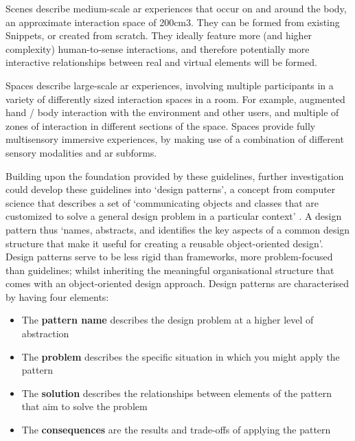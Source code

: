 Scenes describe medium-scale \gls{ar} experiences that occur on and around the body, an approximate interaction space of 200cm3. They can be formed from existing Snippets, or created from scratch. They ideally feature more (and higher complexity) human-to-sense interactions, and therefore potentially more interactive relationships between real and virtual elements will be formed.

Spaces describe large-scale \gls{ar} experiences, involving multiple participants in a variety of differently sized interaction spaces in a room. For example, augmented hand / body interaction with the environment and other users, and multiple of zones of interaction in different sections of the space. Spaces provide fully multisensory immersive experiences, by making use of a combination of different sensory modalities and \gls{ar} subforms.

Building upon the foundation provided by these guidelines, further investigation could develop these guidelines into `design patterns', a concept from computer science that describes a set of `communicating objects and classes that are customized to solve a general design problem in a particular context' \citep{gamma1995}. A design pattern thus `names, abstracts, and identifies the key aspects of a common design structure that make it useful for creating a reusable object-oriented design'. Design patterns serve to be less rigid than frameworks, more problem-focused than guidelines; whilst inheriting the meaningful organisational structure that comes with an object-oriented design approach. Design patterns are characterised by having four elements:
\begin{itemize}
    \item The \textbf{pattern name} describes the design problem at a higher level of abstraction
    \item The \textbf{problem} describes the specific situation in which you might apply the pattern
    \item The \textbf{solution} describes the relationships between elements of the pattern that aim to solve the problem
    \item The \textbf{consequences} are the results and trade-offs of applying the pattern
\end{itemize}





